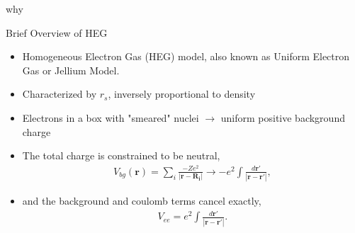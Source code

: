 \documentclass[10pt]{beamer}
\begin{document}
{{{{{\begin{frame}
why

\end{frame}

{%

\begin{frame}{Brief Overview of HEG}
	\begin{itemize}
		\item{Homogeneous Electron Gas (HEG) model, also known as Uniform Electron Gas or Jellium 
		Model.}
		\item{Characterized by \alert{$r_s$}, inversely proportional to density}
		\item{Electrons in a box with "smeared" nuclei $\rightarrow$ uniform positive background charge}

		\item{The total charge is constrained to be neutral,}
			\begin{eqnarray}
				V_{bg}(\mathbf{r}) = \sum\limits_{i} \frac{-Ze^2}{|\mathbf{r}-\mathbf{R_i}|} \rightarrow -e^2 \int \frac{d\mathbf{r'}}{|\mathbf{r}-\mathbf{r'}|},
			\end{eqnarray}
		\item{and the background and coulomb terms cancel exactly,
			\begin{eqnarray}
				V_{ee} = e^2 \int \frac{d\mathbf{r'}}{|\mathbf{r}-\mathbf{r'}|}.
			\end{eqnarray}
		}
	\end{itemize}
\end{frame}

{%

}}}}}}}
\end{document}
